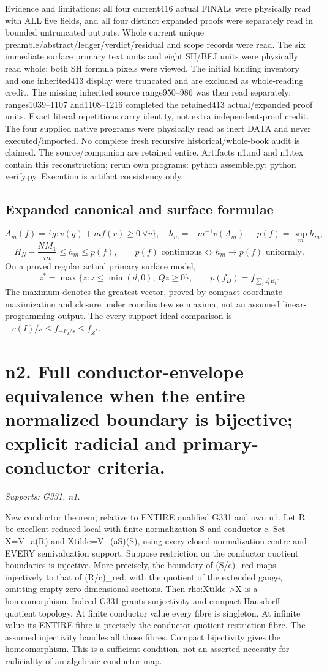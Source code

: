 \documentclass[11pt]{article}
\begin{document}
Evidence and limitations: all four current416 actual FINALs were physically read with ALL five fields, and all four distinct expanded proofs were separately read in bounded untruncated outputs. Whole current unique preamble/abstract/ledger/verdict/residual and scope records were read. The six immediate surface primary text units and eight SH/BFJ units were physically read whole; both SH formula pixels were viewed. The initial binding inventory and one inherited413 display were truncated and are excluded as whole-reading credit. The missing inherited source range950--986 was then read separately; ranges1039--1107 and1108--1216 completed the retained413 actual/expanded proof units. Exact literal repetitions carry identity, not extra independent-proof credit. The four supplied native programs were physically read as inert DATA and never executed/imported. No complete fresh recursive historical/whole-book audit is claimed. The source/companion are retained entire. Artifacts n1.md and n1.tex contain this reconstruction; rerun own programs: python assemble.py; python verify.py. Execution is artifact consistency only.

\subsection*{Expanded canonical and surface formulae}
\[
A_m(f)=\{g:v(g)+mf(v)\geq0\ \forall v\},\quad
h_m=-m^{-1}v(A_m),\quad p(f)=\sup_m h_m,
\]
\[
H_N-\frac{NM_1}{m}\leq h_m\leq p(f),\qquad
p(f)\text{ continuous}\Longleftrightarrow h_m\to p(f)\text{ uniformly}.
\]
On a proved regular actual primary surface model,
\[
z^*=\max\{z:z\leq\min(d,0),\ Qz\geq0\},\qquad
p(f_D)=f_{\sum_i z_i^*E_i}.
\]
The maximum denotes the greatest vector, proved by compact coordinate
maximization and closure under coordinatewise maxima, not an assumed
linear-programming output. The every-support ideal comparison is
$-v(I)/s\leq f_{-F_I/s}\leq f_{Z^*}$.


\section{n2. Full conductor-envelope equivalence when the entire normalized boundary is bijective; explicit radicial and primary-conductor criteria.}
\textit{Supports: G331, n1.}

New conductor theorem, relative to ENTIRE qualified G331 and own n1. Let R be excellent reduced local with finite normalization S and conductor c. Set X=V\_a(R) and Xtilde=V\_(aS)(S), using every closed normalization centre and EVERY semivaluation support. Suppose restriction on the conductor quotient boundaries is injective. More precisely, the boundary of (S/c)\_red maps injectively to that of (R/c)\_red, with the quotient of the extended gauge, omitting empty zero-dimensional sections. Then rho:Xtilde-\textgreater{}X is a homeomorphism. Indeed G331 grants surjectivity and compact Hausdorff quotient topology. At finite conductor value every fibre is singleton. At infinite value its ENTIRE fibre is precisely the conductor-quotient restriction fibre. The assumed injectivity handles all those fibres. Compact bijectivity gives the homeomorphism. This is a sufficient condition, not an asserted necessity for radiciality of an algebraic conductor map.
\end{document}
